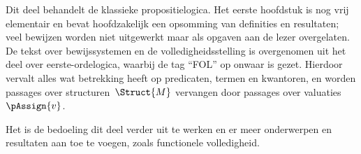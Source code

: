\documentclass[../../include/open-logic-part]{subfiles}
\begin{document}

\begin{editorial}
  Dit deel behandelt de klassieke propositielogica. Het eerste hoofdstuk
  is nog vrij elementair en bevat hoofdzakelijk een opsomming van
  definities en resultaten; veel bewijzen worden niet uitgewerkt maar
  als opgaven aan de lezer overgelaten. De tekst over bewijssystemen en
  de volledigheidsstelling is overgenomen uit het deel over
  eerste-ordelogica, waarbij de tag ``FOL'' op onwaar is gezet. Hierdoor
  vervalt alles wat betrekking heeft op predicaten, termen en kwantoren,
  en worden passages over structuren~$\Struct{M}$ vervangen door
  passages over valuaties~$\pAssign{v}$.

  Het is de bedoeling dit deel verder uit te werken en er meer
  onderwerpen en resultaten aan toe te voegen, zoals
  functionele volledigheid.
\end{editorial}










\OLEndPartHook
\end{document}
